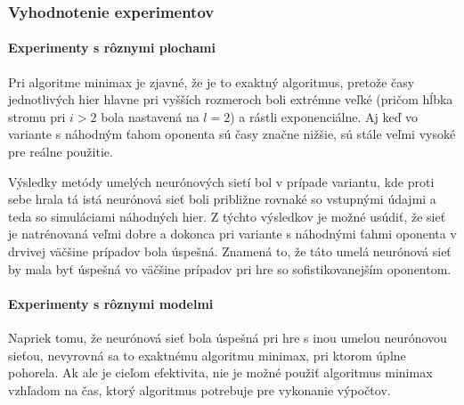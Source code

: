 \subsubsection{Vyhodnotenie experimentov}

\paragraph{Experimenty s rôznymi plochami}

Pri algoritme minimax je zjavné, že je to exaktný algoritmus, pretože časy jednotlivých hier hlavne pri vyšších
rozmeroch boli extrémne veľké (pričom hĺbka stromu pri $i>2$ bola nastavená na $l=2$) a rástli exponenciálne.
Aj keď vo variante s náhodným ťahom oponenta sú časy značne nižšie, sú stále veľmi vysoké pre reálne použitie.

Výsledky metódy umelých neurónových sietí bol v prípade variantu, kde proti sebe hrala tá istá neurónová sieť
boli približne rovnaké so vstupnými údajmi a teda so simuláciami náhodných hier.
Z týchto výsledkov je možné usúdiť, že sieť je natrénovaná veľmi dobre a dokonca pri variante s náhodnými ťahmi oponenta
v drvivej väčšine prípadov bola úspešná.
Znamená to, že táto umelá neurónová sieť by mala byť úspešná vo väčšine prípadov pri hre so sofistikovanejším oponentom.

\paragraph{Experimenty s rôznymi modelmi}

Napriek tomu, že neurónová sieť bola úspešná pri hre s inou umelou neurónovou sieťou, nevyrovná sa to exaktnému
algoritmu minimax, pri ktorom úplne pohorela.
Ak ale je cieľom efektivita, nie je možné použiť algoritmus minimax vzhľadom na čas, ktorý algoritmus potrebuje pre
vykonanie výpočtov.
